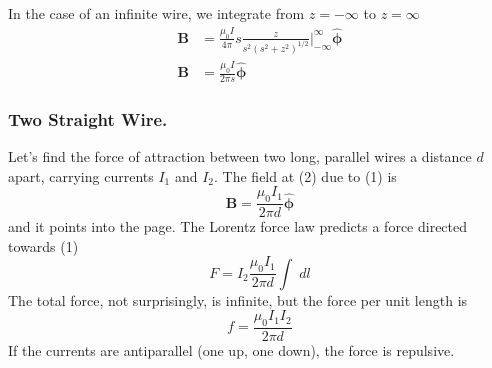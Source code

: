 \documentclass[../../../main.tex]{subfiles}
\begin{document}
In the case of an inﬁnite wire, we integrate from $z=-\infty$ to $z=\infty$
\begin{align*}
    \mathbf{B}&=\frac{\mu_0 I}{4\pi}s\frac{z}{s^2(s^2+z^2)^{1/2}}\bigg|_{- \infty}^{\infty}\boldsymbol{\hat{\phi}}\\
    \mathbf{B}&=\frac{\mu_0 I}{2\pi s}\boldsymbol{\hat{\phi}}
\end{align*}

\subsubsection{Two Straight Wire.}  Let’s ﬁnd the force of attraction between two long, parallel 
wires a distance $d$ apart, carrying currents $I_1$ and $I_2$. The ﬁeld at (2) due to (1) is
\begin{equation*}
    \mathbf{B}=\frac{\mu_0 I_1}{2\pi d}\boldsymbol{\hat{\phi}}
\end{equation*}
and it points into the page. The Lorentz force law predicts a force directed towards (1)
\begin{equation*}
    F=I_2\frac{\mu_0 I_1}{2\pi d}\int\;dl
\end{equation*}
The total force, not surprisingly, is inﬁnite, but the force per unit length is
\begin{equation*}
    f=\frac{\mu_0 I_1I_2}{2\pi d}
\end{equation*}
If the currents are antiparallel (one up, one down), the force is repulsive.
\begin{figure}[ht]
    \centering
\end{figure}
\end{document}
